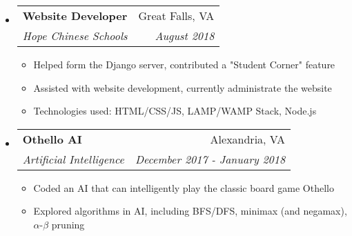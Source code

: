 \documentclass[letterpaper,11pt]{article}
\makeatletter
\newcommand{\resitem}[1]{\item #1 \vspace{-2pt}}
\newcommand{\ressubheading}[4]{
\begin{tabular*}{7.0in}{l@{\extracolsep{\fill}}r}
		\textbf{#1} & #2 \\
		\textit{#3} & \textit{#4} \\
\end{tabular*}\vspace{-6pt}}
\makeatother
\begin{document}
\begin{itemize}
\item
    \ressubheading{Website Developer}{Great Falls, VA}{Hope Chinese Schools}{August 2018}
	\begin{itemize}
		\resitem{Helped form the Django server, contributed a "Student Corner" feature}
		\resitem{Assisted with website development, currently administrate the website}
		\resitem{Technologies used: HTML/CSS/JS, LAMP/WAMP Stack, Node.js}
	\end{itemize}
\item
    \ressubheading{Othello AI}{Alexandria, VA}{Artificial Intelligence}{December 2017 - January 2018}
    \begin{itemize}
        \resitem{Coded an AI that can intelligently play the classic board game Othello}
        \resitem{Explored algorithms in AI, including BFS/DFS, minimax (and negamax), $\alpha$-$\beta$ pruning}

\end{itemize}
\end{itemize}
\end{document}
